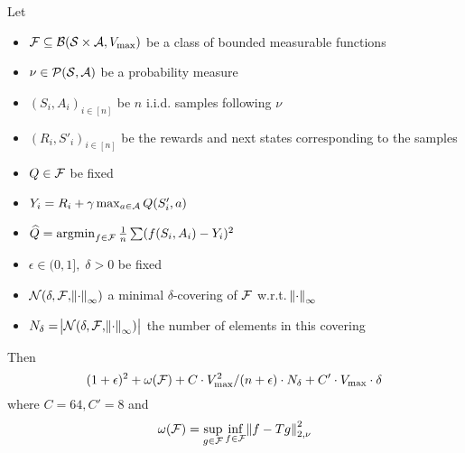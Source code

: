 
\begin{thm}
	Let
	\begin{itemize}
		\item $\mathcal{F} \subseteq \mathcal{B}(\mathcal{S}\times\mathcal{A}, V_{\max})$ be a class of
			bounded measurable functions
		\item $\nu \in \mathcal{P}(\mathcal{S},\mathcal{A})$ be a probability measure
		\item $(S_i, A_i)_{i\in[n]}$ be $n$ i.i.d. samples following $\nu$
		\item $(R_i, S'_i)_{i\in[n]}$ be the rewards and next states
			corresponding to the samples
		\item $Q \in \mathcal{F}$ be fixed
		\item $Y_i = R_i + \gamma \max_{a \in \mathcal{A}} Q(S'_i, a)$
		\item $\widehat{Q} = \operatorname*{argmin}_{f \in \mathcal{F}} \frac{1}{n}
			\sum (f(S_i, A_i) - Y_i)^2$
		\item $\epsilon \in (0,1],\; \delta > 0$ be fixed
		\item $\mathcal{N}(\delta, \mathcal{F}, \norm{\cdot}_\infty)$ a minimal $\delta$-covering
			of $\mathcal{F}$ w.r.t. $\norm{\cdot}_\infty$
		\item $N_\delta = \abs{\mathcal{N}(\delta, \mathcal{F}, \norm{\cdot}_\infty)}$
			the number of elements in this covering
	\end{itemize}
	Then
	\[ (1+\epsilon)^2 + \omega(\mathcal{F}) + C \cdot V_{\max}^2/(n+\epsilon) \cdot N_\delta
	+ C' \cdot V_{\max} \cdot \delta \]
	where $C = 64, C'=8$ and
	\[ \omega(\mathcal{F}) = \sup_{g\in \mathcal{F}} \inf_{f \in \mathcal{F}} \norm{f - T g}_{2, \nu}^2 \]
\end{thm}
